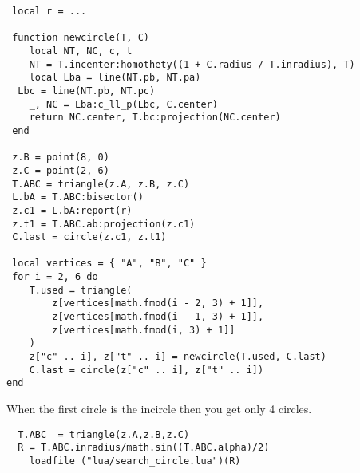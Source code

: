 \begin{mybox}
\begin{verbatim}
 local r = ...

 function newcircle(T, C)
 	local NT, NC, c, t
 	NT = T.incenter:homothety((1 + C.radius / T.inradius), T)
 	local Lba = line(NT.pb, NT.pa)
  Lbc = line(NT.pb, NT.pc)
 	_, NC = Lba:c_ll_p(Lbc, C.center)
 	return NC.center, T.bc:projection(NC.center)
 end

 z.B = point(8, 0)
 z.C = point(2, 6)
 T.ABC = triangle(z.A, z.B, z.C)
 L.bA = T.ABC:bisector()
 z.c1 = L.bA:report(r)
 z.t1 = T.ABC.ab:projection(z.c1)
 C.last = circle(z.c1, z.t1)

 local vertices = { "A", "B", "C" }
 for i = 2, 6 do
	T.used = triangle(
		z[vertices[math.fmod(i - 2, 3) + 1]],
		z[vertices[math.fmod(i - 1, 3) + 1]],
		z[vertices[math.fmod(i, 3) + 1]]
	)
	z["c" .. i], z["t" .. i] = newcircle(T.used, C.last)
	C.last = circle(z["c" .. i], z["t" .. i])
end
\end{verbatim}
\end{mybox}

\vspace{1em}
\begin{tkzexample}[vbox]
\end{tkzexample}

\vspace{12pt}
When the first circle is the incircle then you get only 4 circles.

\begin{mybox}
  \begin{verbatim}
  T.ABC  = triangle(z.A,z.B,z.C)
  R = T.ABC.inradius/math.sin((T.ABC.alpha)/2)
    loadfile ("lua/search_circle.lua")(R)
  \end{verbatim}
\end{mybox}

\begin{tkzexample}[vbox]

\end{tkzexample}

